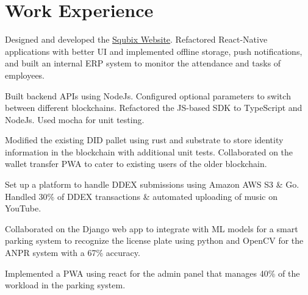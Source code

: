 \documentclass[]{assets/deedy-resume-openfont}
\begin{document}
  \section{Work Experience}
  \hfill {}
      \begin{tightemize}
       \item Designed and developed the {\href{https://squbix.com/}{ \underline{Squbix Website}}}. Refactored React-Native applications with better UI and implemented offline storage, push notifications, and built an internal ERP system to monitor the attendance and tasks of employees.
       \item Built backend APIs using NodeJs. Configured optional parameters to switch between different blockchains. Refactored the JS-based SDK to TypeScript and NodeJs. Used mocha for unit testing.
       \item Modified the existing DID pallet using rust and substrate to store identity information in the blockchain with additional unit tests. Collaborated on the wallet transfer PWA to cater to existing users of the older blockchain.
      \end{tightemize}
      \sectionsep
  \hfill {}
      \begin{tightemize}
    \item Set up a platform to handle DDEX submissions using Amazon AWS S3 \& Go. Handled 30\% of DDEX transactions \& automated uploading of music on YouTube.
\end{tightemize}
      \sectionsep
  \hfill {}
      \begin{tightemize}
    \item Collaborated on the Django web app to integrate with ML models for a smart parking system to recognize the license plate using python and OpenCV for the ANPR system with a 67\% accuracy.
    \item Implemented a PWA using react for the admin panel that manages 40\% of the workload in the parking system.
\end{tightemize}
      \sectionsep
%
%
\end{document}
